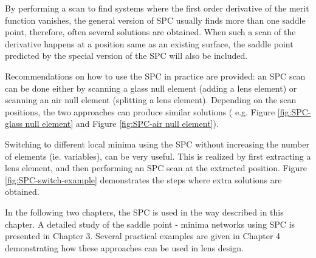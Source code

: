 By performing a scan to find systems where the first order derivative of the merit function vanishes, the general version of SPC usually finds more than one saddle point, therefore, often several solutions are obtained. When such a scan of the derivative happens at a position same as an existing surface, the saddle point predicted by the special version of the SPC will also be included. 

Recommendations on how to use the SPC in practice are provided: an SPC scan can be done either by scanning a glass null element (adding a lens element) or scanning an air null element (splitting a lens element).  Depending on the scan positions, the two approaches can produce similar solutions ( e.g. Figure \ref{fig:SPC-glass null element} and Figure \ref{fig:SPC-air null element}).

Switching to different local minima using the SPC without increasing the number of elements (ie. variables), can be very useful. This is realized by first extracting a lens element, and then performing an SPC scan at the extracted position. Figure \ref{fig:SPC-switch-example} demonstrates the steps where extra solutions are obtained. 

In the following two chapters, the SPC is used in the way described in this chapter. A detailed study of the saddle point - minima networks using SPC is presented in Chapter 3. Several practical examples are given in Chapter 4 demonstrating how these approaches can be used in lens design. 




